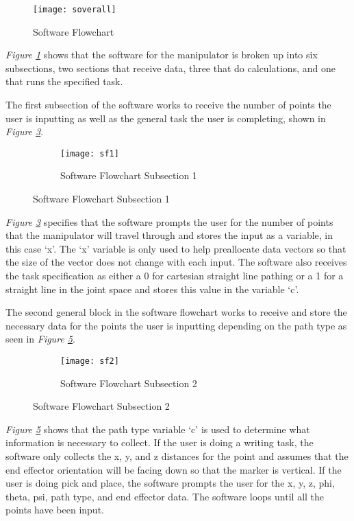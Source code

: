 \begin{figure}[htp]
  \center
  \texttt{[image: soverall]}
  \caption{Software Flowchart}
  \label{fig:soverall}
\end{figure}

\emph{Figure \ref{fig:soverall}} shows that the software for the manipulator is broken up into six subsections, two sections that receive data, three that do calculations, and one that runs the specified task.

The first subsection of the software works to receive the number of points the user is inputting as well as the general task the user is completing, shown in \emph{Figure \ref{fig:sf1}}. \\

\begin{figure}[htp] \ContinuedFloat
  \begin{subfigure}[c]{\textwidth}
  \center
  \texttt{[image: sf1]}
  \caption{Software Flowchart Subsection 1}
  \label{fig:sf1}
  \end{subfigure}
\end{figure}

\emph{Figure \ref{fig:sf1}} specifies that the software prompts the user for the number of points that the manipulator will travel through and stores the input as a variable, in this case ‘x’. The ‘x’ variable is only used to help preallocate data vectors so that the size of the vector does not change with each input. The software also receives the task specification as either a 0 for cartesian straight line pathing or a 1 for a straight line in the joint space and stores this value in the variable ‘c’.

The second general block in the software flowchart works to receive and store the necessary data for the points the user is inputting depending on the path type as seen in \emph{Figure \ref{fig:sf2}}.
\begin{figure}[htp] \ContinuedFloat
  \begin{subfigure}[c]{\textwidth}
  \center
  \texttt{[image: sf2]}
  \caption{Software Flowchart Subsection 2}
  \label{fig:sf2}
\end{subfigure}
\end{figure}

\emph{Figure \ref{fig:sf2}} shows that the path type variable ‘c’ is used to determine what information is necessary to collect. If the user is doing a writing task, the software only collects the x, y, and z distances for the point and assumes that the end effector orientation will be facing down so that the marker is vertical. If the user is doing pick and place, the software prompts the user for the x, y, z, phi, theta, psi, path type, and end effector data. The software loops until all the points have been input.

